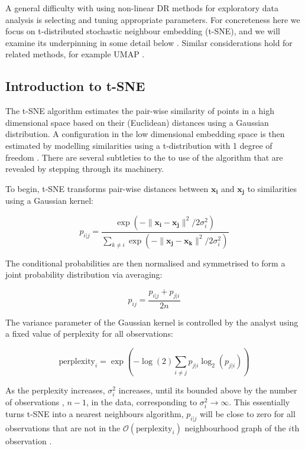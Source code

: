 \documentclass[article,notitle]{jdssv}
\begin{document}
A general difficulty with using
non-linear DR methods for exploratory data analysis is selecting and tuning
appropriate parameters. For concreteness here we focus on t-distributed
stochastic neighbour embedding (t-SNE), and we will examine
its underpinning in some detail below \citep{Maaten2008-sk}. Similar considerations hold for related
methods, for example UMAP \citep{McInnes2018-co}.

\hypertarget{introduction-to-t-sne}{%
\subsection{Introduction to t-SNE}\label{introduction-to-t-sne}}

The t-SNE algorithm estimates the pair-wise similarity of points in a high
dimensional space based on their (Euclidean) distances using a Gaussian
distribution. A configuration in the low dimensional embedding space is then
estimated by modelling similarities using a t-distribution with 1 degree of
freedom \citep{Maaten2008-sk}. There are several subtleties
to the to use of the algorithm that are revealed by stepping through its
machinery.

To begin, t-SNE transforms pair-wise distances between \(\mathbf{x_i}\) and
\(\mathbf{x_j}\) to similarities using a Gaussian kernel:

\[ 
p_{i|j} = \frac{\exp(-\lVert \mathbf{x_i - x_j} \rVert ^ 2 /
2\sigma_i^2)}{\sum_{k \ne i}\exp(-\lVert \mathbf{x_j - x_k} \rVert ^ 2 /
2\sigma_i^2)} 
\]

The conditional probabilities are then normalised and symmetrised to form a
joint probability distribution via averaging:

\[ p_{ij} = \frac{p_{i|j} + p_{j|i}}{2n} \]

The variance parameter of the Gaussian kernel is controlled by the analyst
using a fixed value of perplexity for all observations:

\[ \text{perplexity}_i = \exp(-\log(2) \sum_{i \ne j}p_{j|i}\log_2(p_{j|i})) \]

As the perplexity increases, \(\sigma^2_{i}\) increases, until its bounded above
by the number of observations , \(n-1\), in the data, corresponding to
\(\sigma^2_{i} \rightarrow \infty\). This essentially turns t-SNE into a
nearest neighbours algorithm, \(p_{i|j}\) will be close to zero for all
observations that are not in the \(\mathcal{O}(\text{perplexity}_i)\)
neighbourhood graph of the \(i\)th observation \citep{Van_Der_Maaten2014-zn}.
\end{document}
